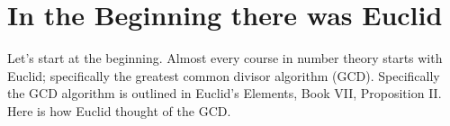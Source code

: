 
\chapter{In the Beginning there was Euclid}
Let's start at the beginning. Almost every course in number theory starts with
Euclid; specifically the greatest common divisor algorithm (GCD). Specifically
the GCD algorithm is outlined in Euclid's Elements, Book VII, Proposition II.
Here is how Euclid thought of the GCD.



